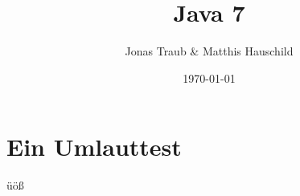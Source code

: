 \documentclass[a4paper,12pt]{article}
\author{Jonas Traub \& Matthis Hauschild}
\title{Java 7}
\date{\today}
\begin{document}
\maketitle
\newpage
%
\tableofcontents
\newpage
%

\section{Ein Umlauttest}
üöß\cite{javainsel2}
%


\end{document}
